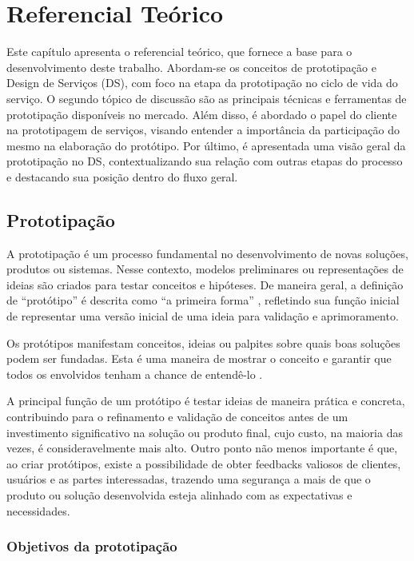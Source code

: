 \chapter[Referencial teórico]{Referencial Teórico}

Este capítulo apresenta o referencial teórico, que fornece a base para o desenvolvimento deste trabalho. Abordam-se os conceitos de prototipação e Design de Serviços (DS), com foco na etapa da prototipação no ciclo de vida do serviço. O segundo tópico de discussão são as principais técnicas e ferramentas de prototipação disponíveis no mercado. Além disso, é abordado o papel do cliente na prototipagem de serviços, visando entender a importância da participação do mesmo na elaboração do protótipo. Por último, é apresentada uma visão geral da prototipação no DS, contextualizando sua relação com outras etapas do processo e destacando sua posição dentro do fluxo geral.

\section{Prototipação}

A prototipação é um processo fundamental no desenvolvimento de novas soluções, produtos ou sistemas. Nesse contexto, modelos preliminares ou representações de ideias são criados para testar conceitos e hipóteses. De maneira geral, a definição de ``protótipo'' é descrita como ``a primeira forma'' \cite{Blomkvist2011existing}, refletindo sua função inicial de representar uma versão inicial de uma ideia para validação e aprimoramento.

Os protótipos manifestam conceitos, ideias ou palpites sobre quais boas soluções podem ser fundadas. Esta é uma maneira de mostrar o conceito e garantir que todos os envolvidos tenham a chance de entendê-lo \cite{Blomkvist2014}.

A principal função de um protótipo é testar ideias de maneira prática e concreta, contribuindo para o refinamento e validação de conceitos antes de um investimento significativo na solução ou produto final, cujo custo, na maioria das vezes, é consideravelmente mais alto. Outro ponto não menos importante é que, ao criar protótipos, existe a possibilidade de obter feedbacks valiosos de clientes, usuários e as partes interessadas, trazendo uma segurança a mais de que o produto ou solução desenvolvida esteja alinhado com as expectativas e necessidades.

\subsection{Objetivos da prototipação}

